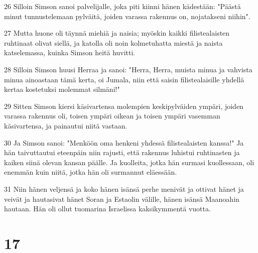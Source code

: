 \par 26 Silloin Simson sanoi palvelijalle, joka piti kiinni hänen kädestään: "Päästä minut tunnustelemaan pylväitä, joiden varassa rakennus on, nojatakseni niihin".
\par 27 Mutta huone oli täynnä miehiä ja naisia; myöskin kaikki filistealaisten ruhtinaat olivat siellä, ja katolla oli noin kolmetuhatta miestä ja naista katselemassa, kuinka Simson heitä huvitti.
\par 28 Silloin Simson huusi Herraa ja sanoi: "Herra, Herra, muista minua ja vahvista minua ainoastaan tämä kerta, oi Jumala, niin että saisin filistealaisille yhdellä kertaa kostetuksi molemmat silmäni!"
\par 29 Sitten Simson kiersi käsivartensa molempien keskipylväiden ympäri, joiden varassa rakennus oli, toisen ympäri oikean ja toisen ympäri vasemman käsivartensa, ja painautui niitä vastaan.
\par 30 Ja Simson sanoi: "Menköön oma henkeni yhdessä filistealaisten kanssa!" Ja hän taivuttautui eteenpäin niin rajusti, että rakennus luhistui ruhtinasten ja kaiken siinä olevan kansan päälle. Ja kuolleita, jotka hän surmasi kuollessaan, oli enemmän kuin niitä, jotka hän oli surmannut eläessään.
\par 31 Niin hänen veljensä ja koko hänen isänsä perhe menivät ja ottivat hänet ja veivät ja hautasivat hänet Soran ja Estaolin välille, hänen isänsä Maanoahin hautaan. Hän oli ollut tuomarina Israelissa kaksikymmentä vuotta.

\chapter{17}

